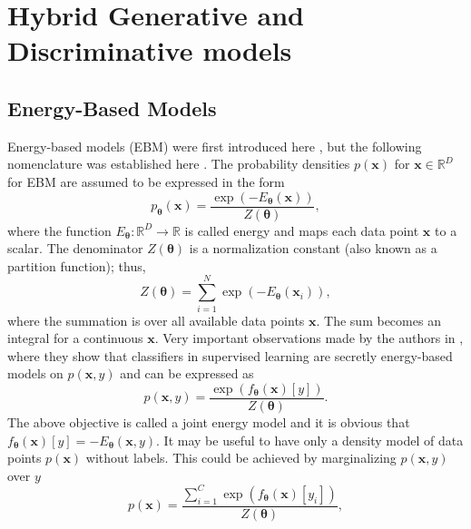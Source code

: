 \chapter{Hybrid Generative and Discriminative models}

\section{Energy-Based Models}\label{EBM}
Energy-based models (EBM) were first introduced here \cite{energy}, but the following nomenclature was established here \cite{energy2}. The probability densities $p(\boldsymbol{x})$ for $\boldsymbol{x} \in \mathbb{R}^D$ for EBM are assumed to be expressed in the form
\begin{equation}
	p_{\boldsymbol{\theta}}\left(\boldsymbol{x}\right) = \frac{\exp\left(-E_{\boldsymbol{\theta}}(\boldsymbol{x})\right)}{Z(\boldsymbol{\theta})},
\end{equation}
where the function $E_{\boldsymbol{\theta}} : \mathbb{R}^D \to \mathbb{R}$ is called energy and maps each data point $\boldsymbol{x}$ to a scalar. The denominator $Z(\boldsymbol{\theta})$ is a normalization constant (also known as a partition function); thus,
\begin{equation}
	Z(\boldsymbol{\theta}) = \sum_{i=1}^N \exp\left(-E_{\boldsymbol{\theta}}(\boldsymbol{x}_i)\right),
\end{equation}
where the summation is over all available data points $\boldsymbol{x}$. The sum becomes an integral for a continuous $\boldsymbol{x}$. Very important observations made by the authors in \cite{energy2}, where they show that classifiers in supervised learning are secretly energy-based models on $p(\boldsymbol{x},y)$ and can be expressed as
\begin{equation}
	p\left(\boldsymbol{x},y\right) = \frac{\exp\left({f_{\boldsymbol{\theta}}\left(\boldsymbol{x}\right)[y]}\right)}{Z(\boldsymbol{\theta})}.
\end{equation}
The above objective is called a joint energy model and it is obvious that $f_{\boldsymbol{\theta}}\left(\boldsymbol{x}\right)[y] = -E_{\boldsymbol{\theta}}(\boldsymbol{x},y)$. It may be useful to have only a density model of data points $p(\boldsymbol{x})$ without labels. This could be achieved by marginalizing $p(\boldsymbol{x},y)$ over $y$ 
\begin{equation}
	p\left(\boldsymbol{x}\right) = \frac{\sum_{i=1}^C\exp\left({f_{\boldsymbol{\theta}}\left(\boldsymbol{x}\right)[y_i]}\right)}{Z(\boldsymbol{\theta})},
\end{equation}
